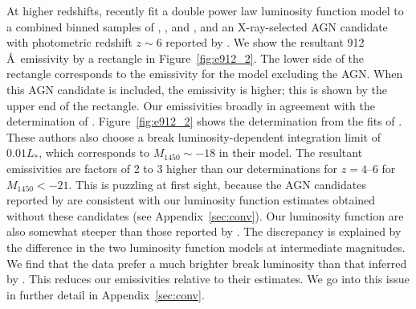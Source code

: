 \documentclass[fleqn,usenatbib]{mnras}
\begin{document}
      At higher redshifts, \citet{2017ApJ...847L..15O} recently fit a double
      power law luminosity function model to a combined binned samples of
      \citet{2016ApJ...833..222J}, \citet{2010AJ....139..906W}, and
      \citet{2015ApJ...798...28K}, and an X-ray-selected AGN candidate with
      photometric redshift $z\sim 6$ reported by
      \citet{2018MNRAS.474.2904P}.  We show the resultant
      912\,\AA\ emissivity by a rectangle in Figure~\ref{fig:e912_2}.  The
      lower side of the rectangle corresponds to the emissivity for the
      \citet{2017ApJ...847L..15O} model excluding the
      \citet{2018MNRAS.474.2904P} AGN.  When this AGN candidate is included,
      the emissivity is higher; this is shown by the upper end of the
      rectangle.  Our emissivities broadly in agreement with the
      determination of \citet{2017ApJ...847L..15O}.  Figure~\ref{fig:e912_2}
      shows the determination from the fits of \citet{2015AA...578A..83G}.
      These authors also choose a break luminosity-dependent integration
      limit of $0.01L_*$, which corresponds to $M_{1450}\sim -18$ in their
      model.  The resultant emissivities are factors of 2 to 3 higher than
      our determinations for $z=4$--$6$ for $M_{1450}<-21$.  This is
      puzzling at first sight, because the AGN candidates reported by
      \citet{2015AA...578A..83G} are consistent with our luminosity function
      estimates obtained without these candidates (see
      Appendix~\ref{sec:conv}).  Our luminosity function are also somewhat
      steeper than those reported by \citet{2015AA...578A..83G}.  The
      discrepancy is explained by the difference in the two luminosity
      function models at intermediate magnitudes.  We find that the data
      prefer a much brighter break luminosity than that inferred by
      \citet{2015AA...578A..83G}.  This reduces our emissivities relative to
      their estimates.  We go into this issue in further detail in
      Appendix~\ref{sec:conv}.
\end{document}
